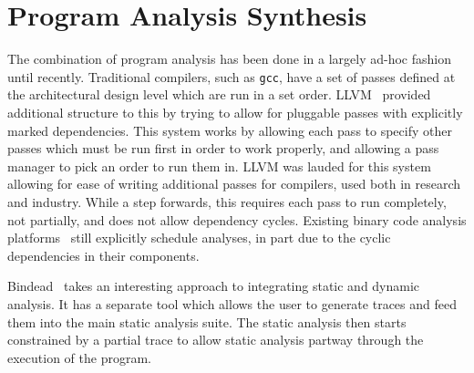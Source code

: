 \section{Program Analysis Synthesis}
The combination of program analysis has been done in a largely ad-hoc fashion until recently.
Traditional compilers, such as \texttt{gcc}, have a set of passes defined at the architectural design level which are run in a set order.
LLVM~\cite{llvm} provided additional structure to this by trying to allow for pluggable passes with explicitly marked dependencies.
This system works by allowing each pass to specify other passes which must be run first in order to work properly, and allowing a pass manager to pick an order to run them in.
LLVM was lauded for this system allowing for ease of writing additional passes for compilers, used both in research and industry.
While a step forwards, this requires each pass to run completely, not partially, and does not allow dependency cycles.
Existing binary code analysis platforms~\cite{jakstab,bap,codesurfer,bitblaze,boomerang,bindead,ida} still explicitly schedule analyses, in part due to the cyclic dependencies in their components.

Bindead~\cite{bindead} takes an interesting approach to integrating static and dynamic analysis.
It has a separate tool which allows the user to generate traces and feed them into the main static analysis suite.
The static analysis then starts constrained by a partial trace to allow static analysis partway through the execution of the program.
